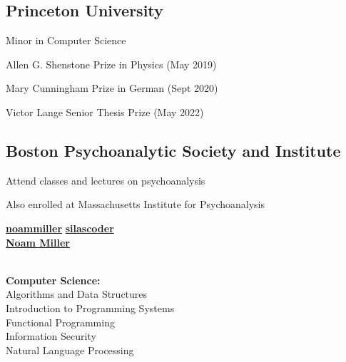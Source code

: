 \documentclass[a4paper]{MagicalCV}
\begin{document}
\lastupdated


\begin{minipage}[t]{0.33\textwidth} 


\subsection{Princeton University}
\vspace{\topsep}
\begin{tightemize}
\item Minor in Computer Science
\item Allen G. Shenstone Prize in Physics (May 2019)
\item Mary Cunningham Prize in German (Sept 2020)
\item Victor Lange Senior Thesis Prize (May 2022)
\end{tightemize}
\hspace{0.3cm}


\subsection{Boston Psychoanalytic Society and Institute}
\vspace{\topsep}
\begin{tightemize}
\item Attend classes and lectures on psychoanalysis
\item Also enrolled at Massachusetts Institute for Psychoanalysis
\end{tightemize}
\sectionsep


 \href{https://github.com/noammiller}{\bf noammiller}
 \href{https://github.com/silascoder}{\bf silascoder} \\
 \href{https://www.linkedin.com/in/noam-miller-8853a4154}{\bf Noam Miller}
\sectionsep

 \\
\textbf{Computer Science:} \\
Algorithms and Data Structures \\
Introduction to Programming Systems \\
Functional Programming \\
Information Security \\
Natural Language Processing \\


\end{minipage}
\end{document}
